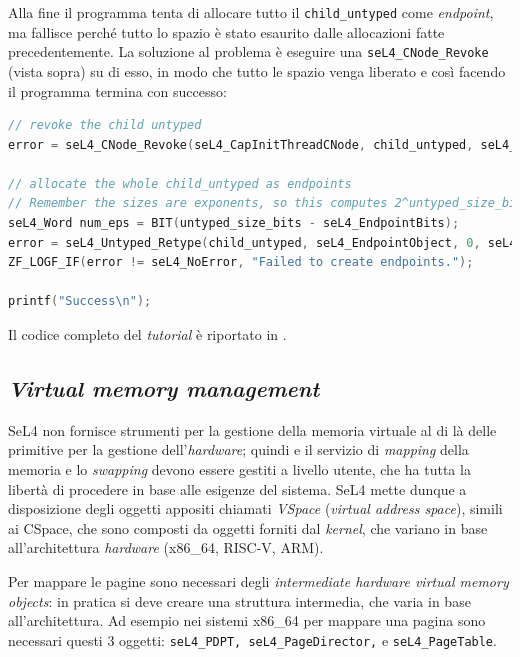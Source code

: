 Alla fine il programma tenta di allocare tutto il \texttt{child\_untyped} come \textit{endpoint}, ma fallisce perché tutto lo spazio è stato esaurito dalle allocazioni fatte precedentemente. La soluzione al problema è eseguire una \texttt{seL4\_CNode\_Revoke} (vista sopra) su di esso, in modo che tutto le spazio venga liberato e così facendo il programma termina con successo:
\begin{lstlisting}[language=C++]
// revoke the child untyped
error = seL4_CNode_Revoke(seL4_CapInitThreadCNode, child_untyped, seL4_WordBits);

// allocate the whole child_untyped as endpoints
// Remember the sizes are exponents, so this computes 2^untyped_size_bits / 2^seL4_EndpointBits:
seL4_Word num_eps = BIT(untyped_size_bits - seL4_EndpointBits);
error = seL4_Untyped_Retype(child_untyped, seL4_EndpointObject, 0, seL4_CapInitThreadCNode, 0, 0, child_tcb, num_eps);
ZF_LOGF_IF(error != seL4_NoError, "Failed to create endpoints.");

printf("Success\n");
\end{lstlisting}
Il codice completo del \textit{tutorial} è riportato in \cite{untyped}.

\subsection{\textit{Virtual memory management}}
SeL4 non fornisce strumenti per la gestione della memoria virtuale al di là delle primitive per la gestione dell'\textit{hardware}; quindi e il servizio di \textit{mapping} della memoria e lo \textit{swapping} devono essere gestiti a livello utente, che ha tutta la libertà di procedere in base alle esigenze del sistema. SeL4 mette dunque a disposizione degli oggetti appositi chiamati \textit{VSpace} (\textit{virtual address space}), simili ai CSpace, che sono composti da oggetti forniti dal \textit{kernel}, che variano in base all'architettura \textit{hardware} (x86\_64, RISC-V, ARM).

Per mappare le pagine sono necessari degli \textit{intermediate hardware virtual memory objects}: in pratica si deve creare una struttura intermedia, che varia in base all'architettura. Ad esempio nei sistemi x86\_64 per mappare una pagina sono necessari questi 3 oggetti: \texttt{seL4\_PDPT, seL4\_PageDirector,} e \texttt{seL4\_PageTable}. 

